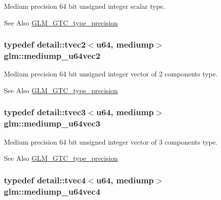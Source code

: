 Medium precision 64 bit unsigned integer scalar type. \begin{DoxySeeAlso}{See Also}
\hyperlink{group__gtc__type__precision}{G\-L\-M\-\_\-\-G\-T\-C\-\_\-type\-\_\-precision} 
\end{DoxySeeAlso}
\hypertarget{group__gtc__type__precision_ga9eda8d6f5be7a2919fb90412535b385f}{
\subsubsection[{mediump\-\_\-u64vec2}]{\setlength{\rightskip}{0pt plus 5cm}typedef detail\-::tvec2$<$u64, mediump$>$ {\bf glm\-::mediump\-\_\-u64vec2}}}\label{group__gtc__type__precision_ga9eda8d6f5be7a2919fb90412535b385f}
Medium precision 64 bit unsigned integer vector of 2 components type. \begin{DoxySeeAlso}{See Also}
\hyperlink{group__gtc__type__precision}{G\-L\-M\-\_\-\-G\-T\-C\-\_\-type\-\_\-precision} 
\end{DoxySeeAlso}
\hypertarget{group__gtc__type__precision_ga7af0601e6a8ce71bd21ecf67971f5154}{
\subsubsection[{mediump\-\_\-u64vec3}]{\setlength{\rightskip}{0pt plus 5cm}typedef detail\-::tvec3$<$u64, mediump$>$ {\bf glm\-::mediump\-\_\-u64vec3}}}\label{group__gtc__type__precision_ga7af0601e6a8ce71bd21ecf67971f5154}
Medium precision 64 bit unsigned integer vector of 3 components type. \begin{DoxySeeAlso}{See Also}
\hyperlink{group__gtc__type__precision}{G\-L\-M\-\_\-\-G\-T\-C\-\_\-type\-\_\-precision} 
\end{DoxySeeAlso}
\hypertarget{group__gtc__type__precision_gae25a6609fa377ba1ec983ec32a91f1d4}{
\subsubsection[{mediump\-\_\-u64vec4}]{\setlength{\rightskip}{0pt plus 5cm}typedef detail\-::tvec4$<$u64, mediump$>$ {\bf glm\-::mediump\-\_\-u64vec4}}}\label{group__gtc__type__precision_gae25a6609fa377ba1ec983ec32a91f1d4}
